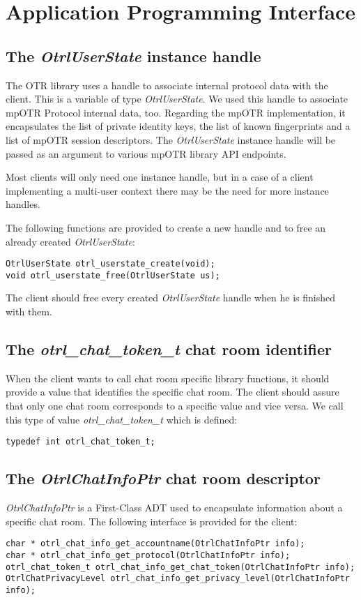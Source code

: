 \section{Application Programming Interface}
\label{section:api}

\subsection{The \emph{OtrlUserState} instance handle}
The OTR library uses a handle to associate internal protocol data with the client. This is a variable of type \emph{OtrlUserState}. We used this handle to associate mpOTR Protocol internal data, too. Regarding the mpOTR implementation, it encapsulates the list of private identity keys, the list of known fingerprints and a list of mpOTR session descriptors. The \emph{OtrlUserState} instance handle will be passed as an argument to various mpOTR library API endpoints.

Most clients will only need one instance handle, but in a case of a client implementing a multi-user context there may be the need for more instance handles.

The following functions are provided to create a new handle and to free an already created \emph{OtrlUserState}:
\begin{lstlisting}[caption={OtrlUserState interface}]
OtrlUserState otrl_userstate_create(void);
void otrl_userstate_free(OtrlUserState us);
\end{lstlisting}
The client should free every created \emph{OtrlUserState} handle when he is finished with them.

\subsection{The \emph{otrl\_chat\_token\_t} chat room identifier}
When the client wants to call chat room specific library functions, it should provide a value that identifies the specific chat room. The client should assure that only one chat room corresponds to a specific value and vice versa. We call this type of value \emph{otrl\_chat\_token\_t} which is defined:
\begin{lstlisting}[caption={otrl\_chat\_token\_t definition}]
typedef int otrl_chat_token_t;
\end{lstlisting}

\subsection{The \emph{OtrlChatInfoPtr} chat room descriptor}
\emph{OtrlChatInfoPtr} is a First-Class ADT used to encapsulate information about a specific chat room. The following interface is provided for the client:
\begin{lstlisting}[caption={OtrlChatInfoPtr First-Class ADT interface}]
char * otrl_chat_info_get_accountname(OtrlChatInfoPtr info);
char * otrl_chat_info_get_protocol(OtrlChatInfoPtr info);
otrl_chat_token_t otrl_chat_info_get_chat_token(OtrlChatInfoPtr info);
OtrlChatPrivacyLevel otrl_chat_info_get_privacy_level(OtrlChatInfoPtr info);
\end{lstlisting}

